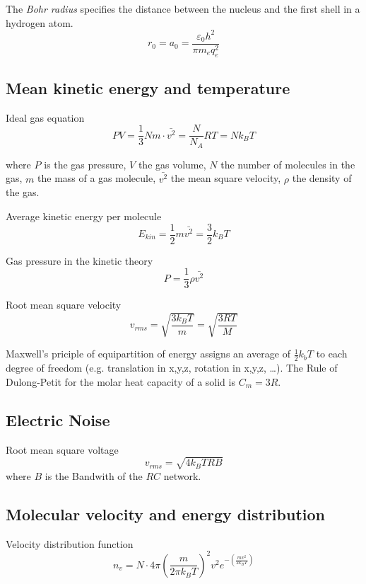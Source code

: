 
The \emph{Bohr radius} specifies the distance between the nucleus and the first shell in a hydrogen atom.
\begin{equation}
	r_0 = a_0 = \frac{\varepsilon_0 h^2}{\pi m_e q_e^2}
\end{equation}

\subsection{Mean kinetic energy and temperature}
Ideal gas equation
\begin{equation}
	PV = \frac{1}{3} Nm \cdot \bar{v^2} = \frac{N}{N_A}RT = N k_B T
\end{equation}

where $P$ is the gas pressure, $V$ the gas volume, $N$ the number of molecules in the gas,
$m$ the mass of a gas molecule, $\bar{v^2}$ the mean square velocity, $\rho$ the density of the gas.

Average kinetic energy per molecule
\begin{equation}
	E_{kin} = \frac{1}{2} m \bar{v^2} = \frac{3}{2} k_B T
\end{equation}

Gas pressure in the kinetic theory
\begin{equation}
	P = \frac{1}{3} \rho \bar{v^2}
\end{equation}

Root mean square velocity
\begin{equation}
	v_{rms} = \sqrt{\frac{3 k_B T}{m}} = \sqrt{\frac{3RT}{M}}
\end{equation}

Maxwell's priciple of equipartition of energy assigns an average of $\frac{1}{2}k_b T$ to 
each degree of freedom (e.g. translation in x,y,z, rotation in x,y,z, \ldots).
The Rule of Dulong-Petit for the molar heat capacity of a solid is $C_m = 3R$.


\subsection{Electric Noise}
Root mean square voltage
\begin{equation}
	v_{rms}  = \sqrt{4 k_B T R B}
\end{equation}
where $B$ is the Bandwith of the $RC$ network.

\subsection{Molecular velocity and energy distribution}
Velocity distribution function
\begin{equation}
	n_v = N \cdot 4 \pi \left(\frac{m}{2\pi k_B T}\right)^2 v^2 e^{-\left(\frac{m v^2}{2 k_B T}\right)}
\end{equation}

